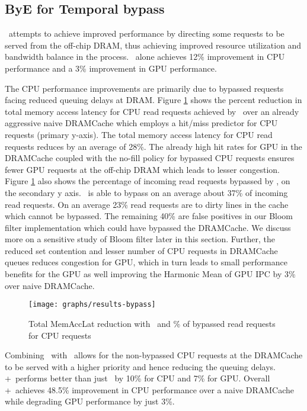 \subsection{ByE for Temporal bypass}
\bypassname\ attempts to achieve improved performance by directing some requests to be served from the off-chip DRAM, thus achieving improved resource utilization and bandwidth balance in the process. \bypassname\ alone achieves 12\% improvement in CPU performance and a 3\% improvement in GPU performance. 
\par The CPU performance improvements are primarily due to bypassed requests facing reduced queuing delays at DRAM. Figure \ref{results-bloom} shows the percent reduction in total memory access latency for CPU read requests achieved by \bypassname\ over an already aggressive naive DRAMCache which employs a hit/miss predictor for CPU requests (primary y-axis). The total memory access latency for CPU read requests reduces by an average of 28\%. The already high hit rates for GPU in the DRAMCache coupled with the no-fill policy for bypassed CPU requests ensures fewer GPU requests at the off-chip DRAM which leads to lesser congestion. Figure \ref{results-bloom} also shows the percentage of incoming read requests bypassed by \bypassname, on the secondary y axis. 
\bypassname\ is able to bypass on an average about 37\% of incoming read requests. On an average 23\% read requests are to dirty lines in the cache which cannot be bypassed.  The remaining 40\% are false positives in our Bloom filter implementation which could have bypassed the DRAMCache. We discuss more on a sensitive study of Bloom filter later in this section. Further, the reduced set contention and lesser number of CPU requests in DRAMCache queues reduces congestion for GPU, which in turn leads to small performance benefits for the GPU as well improving the Harmonic Mean of GPU IPC by 3\% over naive DRAMCache.

\begin{figure}[!htb]
    \centering
    \texttt{[image: graphs/results-bypass]}
    \caption{Total MemAccLat reduction with \bypassname\ and \% of bypassed read requests for CPU requests}
    \label{results-bloom}
\end{figure}

\par Combining \prioname\ with \bypassname\ allows for the non-bypassed CPU requests at the DRAMCache to be served with a higher priority and hence reducing the queuing delays. \bypassname+\prioname\ performs better than just \prioname\ by 10\% for CPU and 7\% for GPU. Overall \bypassname+\prioname\ achieves 48.5\% improvement in CPU performance over a naive DRAMCache while degrading GPU performance by just 3\%.

